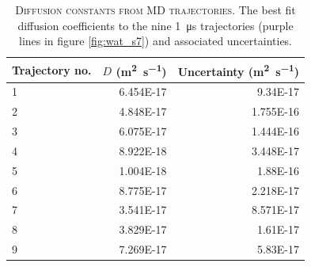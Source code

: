 \clearpage

\begin{table}
    \centering
    \caption[Diffusion constants from MD trajectories]{\textsc{Diffusion constants from MD trajectories}. The best fit diffusion coefficients to the nine \SI{1}{\micro\second} trajectories (purple lines in figure \ref{fig:wat_s7}) and associated uncertainties.}
    \begin{tabular}{lrr}
    \toprule
    Trajectory no. & $D$ (\si{\meter\squared\per\second}) & Uncertainty  (\si{\meter\squared\per\second})  \\
    \midrule
    1 &	6.454E-17	& 9.34E-17 \\
    2 &	4.848E-17	& 1.755E-16 \\
    3 &	6.075E-17	& 1.444E-16 \\
    4 &	8.922E-18	& 3.448E-17 \\
    5 &	1.004E-18	& 1.88E-16 \\
    6 &	8.775E-17	& 2.218E-17 \\
    7 &	3.541E-17	& 8.571E-17 \\
    8 &	3.829E-17	& 1.61E-17 \\
    9 &	7.269E-17	& 5.83E-17 \\
    \bottomrule
    \end{tabular}
    \label{tab:wat_s2}
\end{table}

